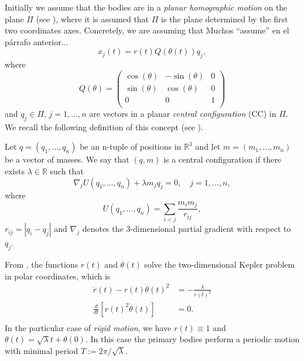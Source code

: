\documentclass[smallcondensed]{svjour3}
\newcommand{\rr}{\mathbb{R}}
\begin{document}
Initially we assume that the bodies are in a \emph{planar homographic motion} on the plane $\Pi$ (see \cite{JaumeLlibre276}), where it is assumed that $\Pi$ is the plane determined by the first two coordinates axes. Concretely,  we are assuming  that
\textcolor[rgb]{1,0,0}{Muchos ``assume'' en el p\'arrafo anterior...}
\begin{equation}\label{eq:x_j=rtQtq_j}
 x_j(t)=r(t)Q(\theta (t))q_j,
\end{equation}
where
\[
 Q(\theta )=\begin{pmatrix}
           \cos(\theta ) & -\sin(\theta ) & 0\\
           \sin(\theta ) & \cos(\theta ) & 0\\
           0            &     0     &  1\\
          \end{pmatrix}
\]
and $q_j\in\Pi$, $j=1,\ldots,n$ are vectors in a planar \emph{central configuration} (CC) in $\Pi$. We recall the following definition of this concept (see \cite{JaumeLlibre276}).

\begin{definition}\label{def:CC}
Let $q=(q_1,\ldots,q_n)$ be  an n-tuple of positions in $\rr^3$ and let $m=(m_1,\ldots,m_n)$ be a vector of masses. We say that $(q,m)$ is a central configuration if
there exists $\lambda\in\rr$ such that
\begin{equation}\label{eq:def.CC}
\nabla_jU(q_1,\ldots,q_n)+\lambda m_jq_j=0,\quad j=1,\ldots,n,
\end{equation}
where
\begin{equation}\label{eq:potencial}
 U(q_1,\ldots,q_n)=\sum_{i<j}\frac{m_im_j}{r_{ij}},
\end{equation}
 $r_{ij}=|q_i-q_j|$ and $\nabla_j$ denotes the $3$-dimensional partial gradient with respect to $q_j$.
\end{definition}

From \cite[Eq. (2.16)]{JaumeLlibre276},  the functions $r(t)$ and $\theta (t)$ solve the two-dimen\-sional Kepler problem in polar coordinates, which is 
\begin{equation}
 \begin{array}{rl}\label{eq:kepler.2.dim}
\ddot{r}(t)-r(t)\dot{\theta}(t)^2 & = -\frac{\lambda}{r(t)^2}\\
\frac{d }{dt}\left[ r(t)^2\dot{\theta}(t)\right] & =0.\\
\end{array}
\end{equation}
In the particular case of \emph{rigid motion}, we have  $r(t)\equiv 1$ and $\theta (t)=\sqrt{\lambda }t +\theta(0)$. In this case the primary bodies perform a periodic motion with minimal period $T:=2\pi/\sqrt{\lambda }$.
\end{document}
